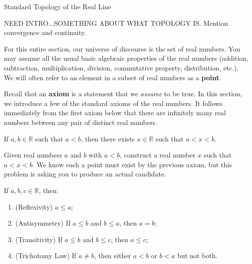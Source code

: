 \begin{section}{Standard Topology of the Real Line}\label{sec:Topology}


NEED INTRO...SOMETHING ABOUT WHAT TOPOLOGY IS. Mention convergence and continuity.


For this entire section, our universe of discourse is the set of real numbers.  You may assume all the usual basic algebraic properties of the real numbers (addition, subtraction, multiplication, division, commutative property, distribution, etc.). We will often refer to an element in a subset of real numbers as a \textbf{point}.

Recall that an \textbf{axiom} is a statement that we \emph{assume} to be true.  In this section, we introduce a few of the standard axioms of the real numbers. It follows immediately from the first axiom below that there are infinitely many real numbers between any pair of distinct real numbers.

\begin{axiom} 
If $a,b\in\mathbb{R}$ such that $a<b$, then there exists $x\in\mathbb{R}$ such that $a<x<b$.
\end{axiom}

\begin{problem}
Given real numbers $a$ and $b$ with $a<b$, construct a real number $x$ such that $a<x<b$.  We know such a point must exist by the previous axiom, but this problem is asking you to produce an actual candidate.
\end{problem}

\begin{axiom}
If $a,b,c\in\mathbb{R}$, then:
\begin{enumerate}[label=\textrm{(\alph*)}]
\item (Reflexivity) $a\leq a$;
\item (Antisymmetry) If $a\leq b$ and $b\leq a$, then $a=b$;
\item (Transitivity) If $a \leq b$ and $b\leq c$, then $a\leq c$;
\item (Trichotomy Law) If $a\neq b$, then either $a<b$ or $b<a$ but not both.
\end{enumerate}
\end{axiom}


\end{section}
